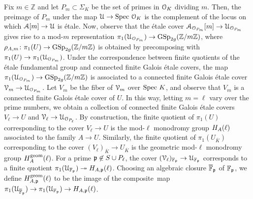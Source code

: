 Fix $m \in \mathbb Z$ and let $P_m \subset \Sigma_K$ be the set of primes in $\mathcal{O}_K$ dividing $m$. Then, the preimage of $P_m$ under the map $\mathcal{U} \to \text{Spec } \mathcal{O}_K$
is the complement of the locus on which $\mathcal{A}[m] \to \mathcal{U}$ is \'etale.
Now, observe that the \'etale cover $\mathcal{A}_{\mathcal O_{P_m}}[m] \to \mathcal{U}_{\mathcal O_{P_m}}$ gives rise to a mod-$m$ representation $\pi_1(\mathcal{U}_{\mathcal O_{P_m}}) \to \operatorname{GSp}_{2g}({\mathbb Z} / m {\mathbb Z})$, where $\rho_{A, m} \colon \pi_1(U) \to \operatorname{GSp}_{2g}({\mathbb Z} / m {\mathbb Z})$ is obtained by precomposing with $\pi_1(U) \to \pi_1(\mathcal{U}_{\mathcal O_{P_m}})$. Under the correspondence between finite quotients of the \'etale fundamental group and connected finite Galois \'etale covers, the map $\pi_1(\mathcal{U}_{\mathcal O_{P_m}}) \to \operatorname{GSp}_{2g}({\mathbb Z} / m {\mathbb Z})$ is associated to a connected finite Galois \'etale cover $\mathcal{V}_m \to \mathcal{U}_{\mathcal O_{P_m}}$. Let $V_m$ be the fiber of $\mathcal{V}_m$ over $\text{Spec } K$, and observe that $V_m$ is a connected finite Galois \'etale cover of $U$.
In this way, letting $m = \ell$ vary over the prime numbers, we obtain a collection of connected finite Galois \'etale covers $V_\ell \to U$ and $\mathcal V_\ell \to \mathcal U_{\mathcal O_{P_\ell}}$. By construction, the finite quotient of $\pi_1(U)$ corresponding to the cover $V_\ell \to U$ is the mod-$\ell$ monodromy group $H_A(\ell)$ associated to the family $A \to U$. Similarly, the finite quotient of $\pi_1(U_{\overline K})$ corresponding to the cover $(V_\ell)_{\overline K} \rightarrow U_{\overline K}$ is the geometric mod-$\ell$ monodromy group $H_A^{\operatorname{geom}}(\ell)$. For a prime ${\mathfrak p} \not\in S \cup P_\ell$, the cover $(\mathcal V_\ell)_{\mathbb F_\mathfrak p} \to \mathcal U_{\mathbb F_\mathfrak p}$
corresponds to a finite quotient $\pi_1(\mathcal U_{\mathbb F_\mathfrak p}) \twoheadrightarrow H_{A,{\mathfrak p}}(\ell)$.
Choosing an algebraic closure $\overline{\mathbb F}_\mathfrak p$ of $\mathbb F_\mathfrak p$, we define $H_{A,\mathfrak p}^{\operatorname{geom}}(\ell)$ to be the image of the \mbox{composite map $\pi_1(\mathcal U_{\overline{\mathbb F}_\mathfrak p}) \to \pi_1(\mathcal U_{\mathbb F_\mathfrak p}) \to H_{A,\mathfrak p}(\ell)$.}
